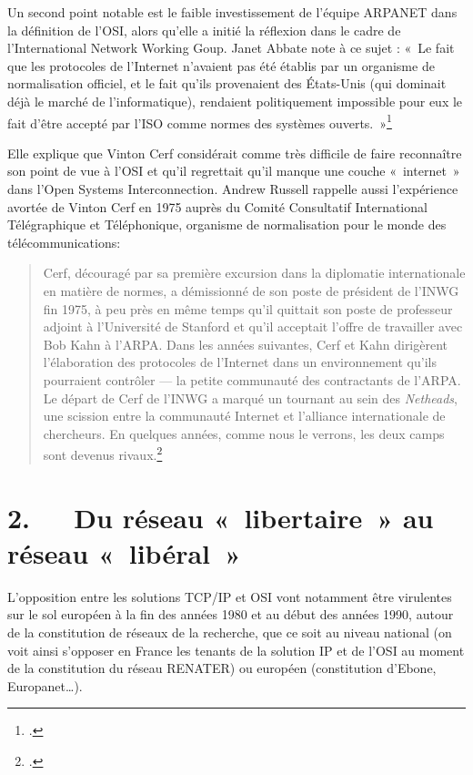 \documentclass{FramateX}
\begin{document}
\begin{refsection}
Un second point notable est le faible investissement de
l'équipe ARPANET dans la définition de
l'OSI, alors qu'elle a initié la
réflexion dans le cadre de l'International Network Working Goup. Janet Abbate note à ce
sujet : «~Le fait que les protocoles de l'Internet
n'avaient pas été établis par un organisme de
normalisation officiel, et le fait qu'ils provenaient
des États-Unis (qui dominait déjà le marché de
l'informatique), rendaient politiquement impossible
pour eux le fait d'être accepté par
l'ISO comme normes des systèmes
ouverts.~»\footnote{\cite[p.~173]{abbateinventing1999}.}


Elle explique que Vinton Cerf considérait comme très difficile de faire
reconnaître son point de vue à l'OSI et
qu'il regrettait qu'il manque une
couche «~internet~» dans l'Open Systems
Interconnection. Andrew Russell rappelle aussi
l'expérience avortée de Vinton Cerf en 1975 auprès du
Comité Consultatif International Télégraphique et Téléphonique,
organisme de normalisation pour le monde des télécommunications:

\begin{quote}
Cerf, découragé par sa première excursion dans la diplomatie
internationale en matière de normes, a démissionné de son poste de
président de l'INWG fin 1975, à peu près en même temps
qu'il quittait son poste de professeur adjoint à
l'Université de Stanford et qu'il
acceptait l'offre de travailler avec Bob Kahn à
l'ARPA. Dans les années suivantes, Cerf et Kahn
dirigèrent l'élaboration des protocoles de
l'Internet dans un environnement
qu'ils pourraient contrôler — la petite communauté des
contractants de l'ARPA. Le départ de Cerf de
l'INWG a marqué un tournant au sein des
\textit{Netheads}, une scission entre la
communauté Internet et l'alliance internationale de
chercheurs. En quelques années, comme nous le verrons, les deux camps
sont devenus rivaux.\footnote{\cite{russellopen}.}
\end{quote}

\section*{2.~~~Du réseau «~libertaire~» au réseau «~libéral~»}
{}


L'opposition entre les solutions TCP/IP et OSI vont
notamment être virulentes sur le sol européen à la fin des années 1980
et au début des années 1990, autour de la constitution de réseaux de la
recherche, que ce soit au niveau national (on voit ainsi
s'opposer en France les tenants de la solution IP et
de l'OSI au moment de la constitution du réseau
RENATER) ou européen (constitution d'Ebone,
Europanet\ldots). 


\end{refsection}
\end{document}
